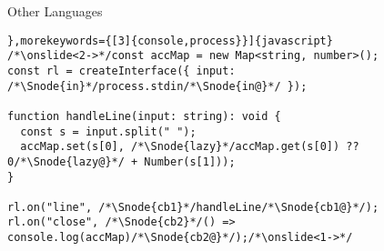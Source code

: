 {\begin{frame}[fragile]{Other Languages}
\begin{layout-imageonly}
\vspace*{-\baselineskip}
   \begin{verbatim}},morekeywords={[3]{console,process}}]{javascript}
/*\onslide<2->*/const accMap = new Map<string, number>();
const rl = createInterface({ input: /*\Snode{in}*/process.stdin/*\Snode{in@}*/ });

function handleLine(input: string): void {
  const s = input.split(" ");
  accMap.set(s[0], /*\Snode{lazy}*/accMap.get(s[0]) ?? 0/*\Snode{lazy@}*/ + Number(s[1]));
}

rl.on("line", /*\Snode{cb1}*/handleLine/*\Snode{cb1@}*/);
rl.on("close", /*\Snode{cb2}*/() => console.log(accMap)/*\Snode{cb2@}*/);/*\onslide<1->*/
   \end{verbatim}
\end{layout-imageonly}
\end{frame}
\SidebarReset

{

}}
